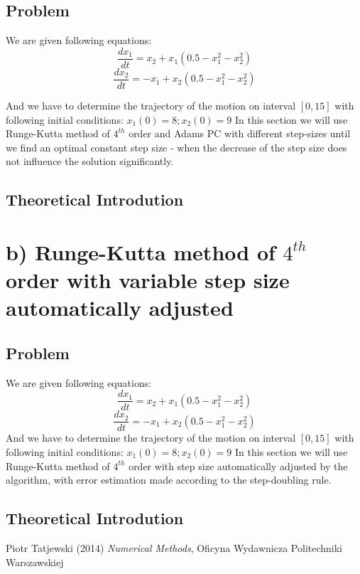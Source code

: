 \documentclass[12pt]{report}
\begin{document}
\subsection{Problem}
We are given following equations:
\[ \frac{dx_1}{dt} = x_2 + x_1(0.5 - x_1^2 - x_2^2) \]
\[ \frac{dx_2}{dt} = -x_1 + x_2(0.5 - x_1^2 - x_2^2) \]

And we have to determine the trajectory of the motion on interval $[0, 15]$ with following initial conditions:
$ x_1(0) = 8; x_2(0) = 9 $
In this section we will use Runge-Kutta method of $4^{th}$ order and Adams PC with different step-sizes until we find an optimal constant step size - when the decrease of the step size does not influence the solution significantly.

\subsection{Theoretical Introdution}

\section{b) Runge-Kutta method of $4^{th}$ order with variable step size automatically adjusted}
\subsection{Problem}
We are given following equations:
\[ \frac{dx_1}{dt} = x_2 + x_1(0.5 - x_1^2 - x_2^2) \]
\[ \frac{dx_2}{dt} = -x_1 + x_2(0.5 - x_1^2 - x_2^2) \]
And we have to determine the trajectory of the motion on interval $[0, 15]$ with following initial conditions:
$ x_1(0) = 8; x_2(0) = 9 $
In this section we will use Runge-Kutta method of $4^{th}$ order with step size automatically adjusted by the algorithm, with error estimation made according to the step-doubling rule.
\subsection{Theoretical Introdution}

\begin{thebibliography}{9}
Piotr Tatjewski (2014) \emph{Numerical Methods}, Oficyna Wydawnicza Politechniki Warszawskiej
\end{thebibliography}
\end{document}
